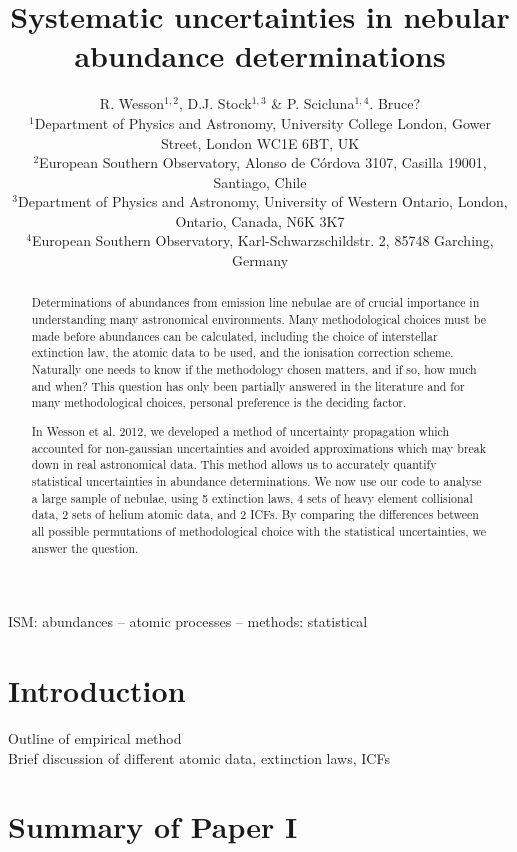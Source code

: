 \documentclass[useAMS,usenatbib]{../paper/mn2e}
\title[Systematic uncertainties in nebular abundances]{Systematic uncertainties in nebular abundance determinations} %
\author[R. Wesson et al.]{R. Wesson$^{1,2}$, D.J. Stock$^{1,3}$ \& P. Scicluna$^{1,4}$.  Bruce?\\
$^1$Department of Physics and Astronomy, University College London, Gower Street, London WC1E 6BT, UK\\
$^2$European Southern Observatory, Alonso de C\'ordova 3107, Casilla 19001, Santiago, Chile\\
$^3$Department of Physics and Astronomy, University of Western Ontario, London, Ontario, Canada, N6K 3K7\\
$^4$European Southern Observatory, Karl-Schwarzschildstr. 2, 85748 Garching, Germany\\ 
}
\begin{document}
\date{}

\pagerange{\pageref{firstpage}--\pageref{lastpage}} 

\maketitle

\label{firstpage}

\begin{abstract}

Determinations of abundances from emission line nebulae are of crucial importance in understanding many astronomical environments.  Many methodological choices must be made before abundances can be calculated, including the choice of interstellar extinction law, the atomic data to be used, and the ionisation correction scheme.  Naturally one needs to know if the methodology chosen matters, and if so, how much and when?  This question has only been partially answered in the literature and for many methodological choices, personal preference is the deciding factor.

In Wesson et al. 2012, we developed a method of uncertainty propagation which accounted for non-gaussian uncertainties and avoided approximations which may break down in real astronomical data.  This method allows us to accurately quantify statistical uncertainties in abundance determinations.  We now use our code to analyse a large sample of nebulae, using 5 extinction laws, 4 sets of heavy element collisional data, 2 sets of helium atomic data, and 2 ICFs.  By comparing the differences between all possible permutations of methodological choice with the statistical uncertainties, we answer the question.

\end{abstract}

\begin{keywords}
ISM: abundances -- atomic processes -- methods: statistical
\end{keywords}

\section{Introduction}

Outline of empirical method\\
Brief discussion of different atomic data, extinction laws, ICFs\\

\section{Summary of Paper I}
\end{document}
